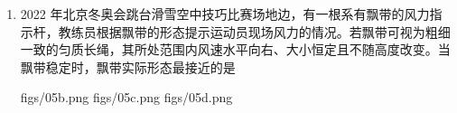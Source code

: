 \documentclass[\gkver]{gaokaozhenti}
\begin{document}
\begin{enumerate}
{联立解得

$v_{2} = \frac{2}{15}v_{0}$

可得

$v_{1} = v_{0} > v_{2}$

碰撞后氢核的动量为

$p_{H} = mv_{1} = mv_{0}$

氮核的动量为

$p_{N} = 14mv_{2} = \frac{28mv_{0}}{15}$

可得

$p_{N} > p_{H}$

碰撞后氢核的动能为

$E_{kH} = \frac{1}{2}mv_{1}^{2} = \frac{1}{2}mv_{0}^{2}$

氮核的动能为

$E_{kN} = \frac{1}{2}\cdot 14mv_{2}^{2} = \frac{28mv_{0}^{2}}{225}$

可得 $E_{kH} > E_{kN}$。

故 B 正确，ACD 错误。

故选 B。
}

\item
2022 年北京冬奥会跳台滑雪空中技巧比赛场地边，有一根系有飘带的风力指示杆，教练员根据飘带的形态提示运动员现场风力的情况。若飘带可视为粗细一致的匀质长绳，其所处范围内风速水平向右、大小恒定且不随高度改变。当飘带稳定时，飘带实际形态最接近的是

{figs/05b.png}
{figs/05c.png}
{figs/05d.png}



\end{enumerate}
\end{document}
